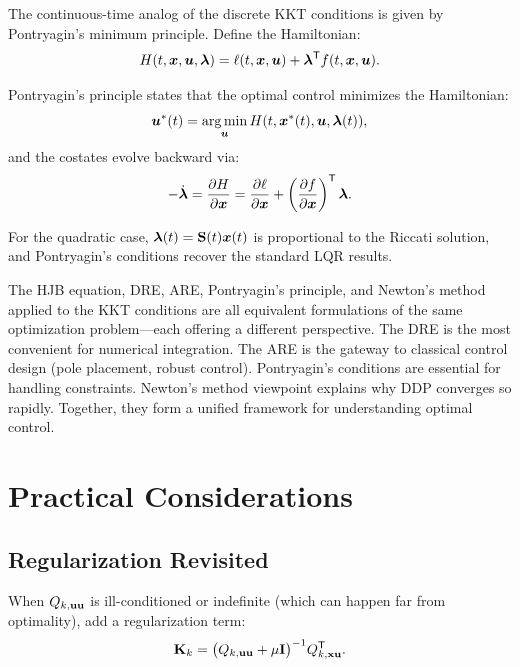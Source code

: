 The continuous-time analog of the discrete KKT conditions is given by Pontryagin's minimum principle. Define the
Hamiltonian:
\begin{equation}
H(t,\bm{x},\bm{u},\bm{\lambda}) = \ell(t,\bm{x},\bm{u}) + \bm{\lambda}^{\mathsf{T}} f(t,\bm{x},\bm{u}).
\label{eq:ch5:hamiltonian-ct}
\end{equation}

Pontryagin's principle states that the optimal control minimizes the Hamiltonian:
\begin{equation}
\bm{u}^*(t) = \operatorname*{arg\,min}_{\bm{u}} H(t,\bm{x}^*(t),\bm{u},\bm{\lambda}(t)),
\label{eq:ch5:minimum-principle}
\end{equation}
and the costates evolve backward via:
\begin{equation}
-\dot{\bm{\lambda}} = \frac{\partial H}{\partial \bm{x}} = \frac{\partial \ell}{\partial \bm{x}} + \left(\frac{\partial f}{\partial \bm{x}}\right)^{\mathsf{T}}\bm{\lambda}.
\label{eq:ch5:costate-ode}
\end{equation}

For the quadratic case, $\bm{\lambda}(t) = \mathbf{S}(t)\bm{x}(t)$ is proportional to the Riccati solution, and
Pontryagin's conditions recover the standard LQR results.

\begin{intuitionbox}
The HJB equation, DRE, ARE, Pontryagin's principle, and Newton's method applied to the KKT conditions
are all equivalent formulations of the same optimization problem---each offering a different perspective.
The DRE is the most convenient for numerical integration. The ARE is the gateway to classical control
design (pole placement, robust control). Pontryagin's conditions are essential for handling constraints.
Newton's method viewpoint explains why DDP converges so rapidly. Together, they form a unified framework
for understanding optimal control.
\end{intuitionbox}

\section{Practical Considerations}

\subsection{Regularization Revisited}

When $Q_{k,\mathbf{u}\mathbf{u}}$ is ill-conditioned or indefinite (which can happen far from optimality), add a regularization term:
\begin{equation}
\mathbf{K}_k = \bigl(Q_{k,\mathbf{u}\mathbf{u}} + \mu\mathbf{I}\bigr)^{-1}Q_{k,\mathbf{x}\mathbf{u}}^{\mathsf{T}}.
\label{eq:ch5:regularized-gain}
\end{equation}

